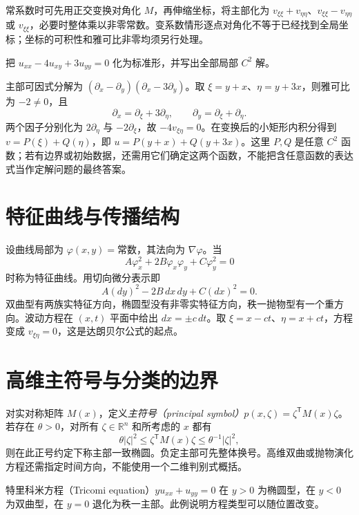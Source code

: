 常系数时可先用正交变换对角化 $M$，再伸缩坐标，将主部化为 $v_{\xi\xi}+v_{\eta\eta}$、$v_{\xi\xi}-v_{\eta\eta}$ 或 $v_{\xi\xi}$，必要时整体乘以非零常数。变系数情形逐点对角化不等于已经找到全局坐标；坐标的可积性和雅可比非零均须另行处理。

\begin{example}[直接用特征坐标消去平方项]
把 $u_{xx}-4u_{xy}+3u_{yy}=0$ 化为标准形，并写出全部局部 $C^2$ 解。
\end{example}
\begin{solve}
主部可因式分解为 $(\partial_x-\partial_y)(\partial_x-3\partial_y)$。取 $\xi=y+x$、$\eta=y+3x$，则雅可比为 $-2\ne0$，且
\[
 \partial_x=\partial_\xi+3\partial_\eta,\qquad
 \partial_y=\partial_\xi+\partial_\eta.
\]
两个因子分别化为 $2\partial_\eta$ 与 $-2\partial_\xi$，故 $-4v_{\xi\eta}=0$。在变换后的小矩形内积分得到 $v=P(\xi)+Q(\eta)$，即 $u=P(y+x)+Q(y+3x)$。这里 $P,Q$ 是任意 $C^2$ 函数；若有边界或初始数据，还需用它们确定这两个函数，不能把含任意函数的表达式当作定解问题的最终答案。
\end{solve}

\section{特征曲线与传播结构}
设曲线局部为 $\varphi(x,y)=\text{常数}$，其法向为 $\nabla\varphi$。当
\[
 A\varphi_x^2+2B\varphi_x\varphi_y+C\varphi_y^2=0
\]
时称为特征曲线。用切向微分表示即
\[
 A(dy)^2-2B\,dx\,dy+C(dx)^2=0.
\]
双曲型有两族实特征方向，椭圆型没有非零实特征方向，秩一抛物型有一个重方向。波动方程在 $(x,t)$ 平面中给出 $dx=\pm c\,dt$。取 $\xi=x-ct$、$\eta=x+ct$，方程变成 $v_{\xi\eta}=0$，这是达朗贝尔公式的起点。

\section{高维主符号与分类的边界}
对实对称矩阵 $M(x)$，定义\emph{主符号（principal symbol）}$p(x,\zeta)=\zeta^{\mathsf T}M(x)\zeta$。若存在 $\theta>0$，对所有 $\zeta\in\mathbb R^n$ 和所考虑的 $x$ 都有
\[
 \theta|\zeta|^2\le\zeta^{\mathsf T}M(x)\zeta\le\theta^{-1}|\zeta|^2,
\]
则在此正号约定下称主部一致椭圆。负定主部可先整体换号。高维双曲或抛物演化方程还需指定时间方向，不能使用一个二维判别式概括。

特里科米方程（Tricomi equation）$y u_{xx}+u_{yy}=0$ 在 $y>0$ 为椭圆型，在 $y<0$ 为双曲型，在 $y=0$ 退化为秩一主部。此例说明方程类型可以随位置改变。

